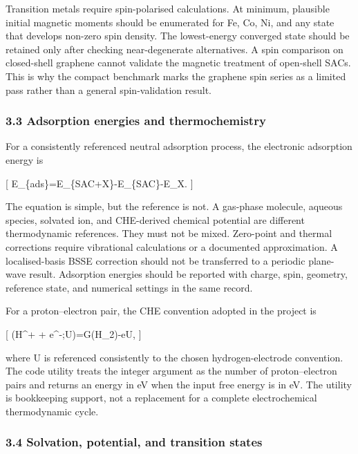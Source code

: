 \documentclass[
]{article}
\begin{document}
Transition metals require spin-polarised calculations. At minimum,
plausible initial magnetic moments should be enumerated for Fe, Co, Ni,
and any state that develops non-zero spin density. The lowest-energy
converged state should be retained only after checking near-degenerate
alternatives. A spin comparison on closed-shell graphene cannot validate
the magnetic treatment of open-shell SACs. This is why the compact
benchmark marks the graphene spin series as a limited pass rather than a
general spin-validation result.

\hypertarget{adsorption-energies-and-thermochemistry}{%
\subsubsection{3.3 Adsorption energies and
thermochemistry}\label{adsorption-energies-and-thermochemistry}}

For a consistently referenced neutral adsorption process, the electronic
adsorption energy is

{[} E\_\{ads\}=E\_\{SAC+X\}-E\_\{SAC\}-E\_X. {]}

The equation is simple, but the reference is not. A gas-phase molecule,
aqueous species, solvated ion, and CHE-derived chemical potential are
different thermodynamic references. They must not be mixed. Zero-point
and thermal corrections require vibrational calculations or a documented
approximation. A localised-basis BSSE correction should not be
transferred to a periodic plane-wave result. Adsorption energies should
be reported with charge, spin, geometry, reference state, and numerical
settings in the same record.

For a proton--electron pair, the CHE convention adopted in the project
is

{[} \mu(H\^{}+ + e\^{}-;U)=G(H\_2)-eU, {]}

where U is referenced consistently to the chosen hydrogen-electrode
convention. The code utility treats the integer argument as the number
of proton--electron pairs and returns an energy in eV when the input
free energy is in eV. The utility is bookkeeping support, not a
replacement for a complete electrochemical thermodynamic cycle.

\hypertarget{solvation-potential-and-transition-states}{%
\subsubsection{3.4 Solvation, potential, and transition
states}\label{solvation-potential-and-transition-states}}
\end{document}

